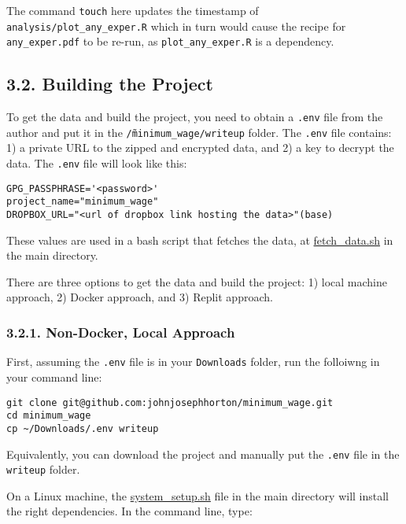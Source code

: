 \documentclass[10pt]{article}
\begin{document}
The command \texttt{touch} here updates the timestamp of \texttt{analysis/plot\_any\_exper.R} which in turn would cause the recipe for \texttt{any\_exper.pdf} to be re-run, as \texttt{plot\_any\_exper.R} is a dependency.

\subsection*{3.2. Building the Project}

To get the data and build the project, you need to obtain a \texttt{.env} file from the author and put it in the \texttt{\~/minimum\_wage/writeup} folder. 
The \texttt{.env} file contains: 1) a private URL to the zipped and encrypted data, and 2) a key to decrypt the data. 
The \texttt{.env} file will look like this:

\begin{verbatim}
GPG_PASSPHRASE='<password>'
project_name="minimum_wage"
DROPBOX_URL="<url of dropbox link hosting the data>"(base)
\end{verbatim}

These values are used in a bash script that fetches the data, at \href{https://www.github.com/johnjosephhorton/minimum_wage/blob/main/fetch_data.sh}{fetch\_data.sh} in the main directory.

There are three options to get the data and build the project: 1) local machine approach, 2) Docker approach, and 3) Replit approach.

\subsubsection*{3.2.1. Non-Docker, Local Approach}

First, assuming the \texttt{.env} file is in your \texttt{Downloads} folder, run the folloiwng in your command line:

\begin{verbatim}
git clone git@github.com:johnjosephhorton/minimum_wage.git
cd minimum_wage
cp ~/Downloads/.env writeup
\end{verbatim}

Equivalently, you can download the project and manually put the \texttt{.env} file in the \texttt{writeup} folder.

On a Linux machine, the \href{https://www.github.com/johnjosephhorton/minimum_wage/blob/main/system_setup.sh}{system\_setup.sh} file in the main directory will install the right dependencies. 
In the command line, type:
\end{document}
